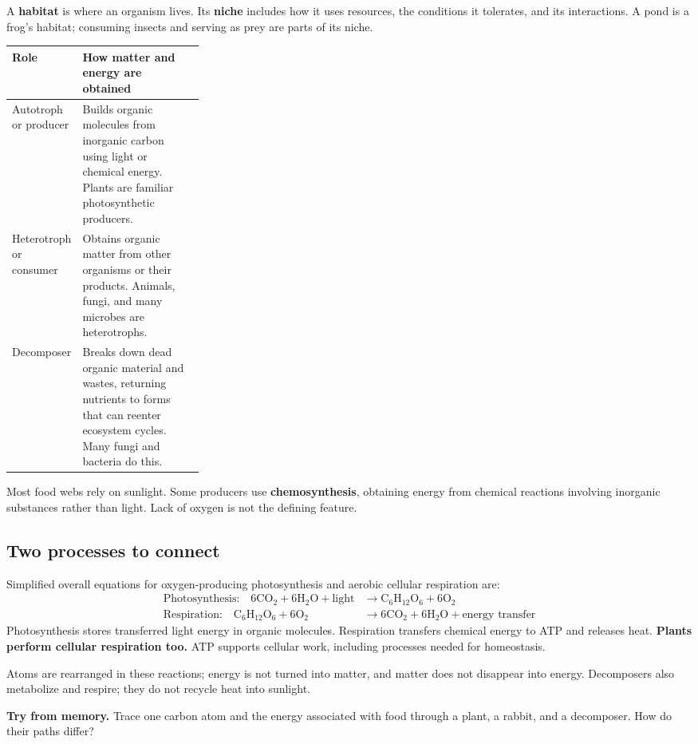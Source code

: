 \documentclass[11pt,letterpaper]{article}
\newcommand{\memorycheck}[1]{\par\smallskip\textbf{Try from memory.} #1\par}
\begin{document}
A \textbf{habitat} is where an organism lives. Its \textbf{niche} includes how it uses resources, the conditions it tolerates, and its interactions. A pond is a frog's habitat; consuming insects and serving as prey are parts of its niche.
\par
\begin{tabularx}{\linewidth}{@{}p{0.28\linewidth}Y@{}}\toprule
Role & How matter and energy are obtained\\\midrule
Autotroph or producer & Builds organic molecules from inorganic carbon using light or chemical energy. Plants are familiar photosynthetic producers.\\
Heterotroph or consumer & Obtains organic matter from other organisms or their products. Animals, fungi, and many microbes are heterotrophs.\\
Decomposer & Breaks down dead organic material and wastes, returning nutrients to forms that can reenter ecosystem cycles. Many fungi and bacteria do this.\\\bottomrule
\end{tabularx}
\par
Most food webs rely on sunlight. Some producers use \textbf{chemosynthesis}, obtaining energy from chemical reactions involving inorganic substances rather than light. Lack of oxygen is not the defining feature.
\subsection*{Two processes to connect}
Simplified overall equations for oxygen-producing photosynthesis and aerobic cellular respiration are:
\begin{align*}
\text{Photosynthesis:}\quad 6\mathrm{CO_2}+6\mathrm{H_2O}+\text{light}
&\longrightarrow \mathrm{C_6H_{12}O_6}+6\mathrm{O_2}\\
\text{Respiration:}\quad \mathrm{C_6H_{12}O_6}+6\mathrm{O_2}
&\longrightarrow 6\mathrm{CO_2}+6\mathrm{H_2O}+\text{energy transfer}
\end{align*}
Photosynthesis stores transferred light energy in organic molecules. Respiration transfers chemical energy to ATP and releases heat. \textbf{Plants perform cellular respiration too.} ATP supports cellular work, including processes needed for homeostasis.

Atoms are rearranged in these reactions; energy is not turned into matter, and matter does not disappear into energy. Decomposers also metabolize and respire; they do not recycle heat into sunlight.
\memorycheck{Trace one carbon atom and the energy associated with food through a plant, a rabbit, and a decomposer. How do their paths differ?}
\end{document}
